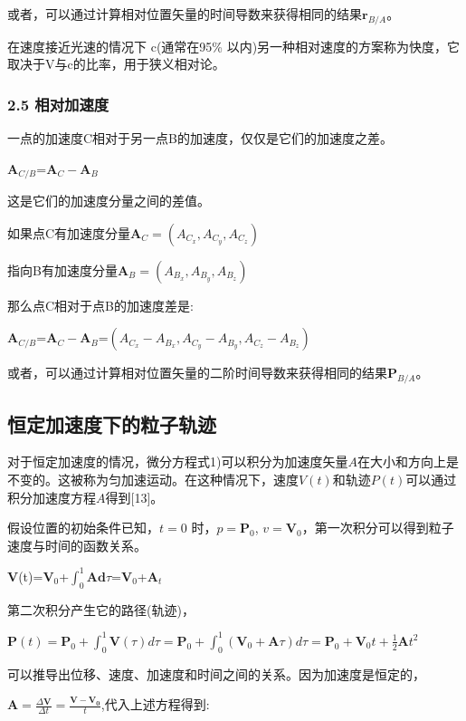或者，可以通过计算相对位置矢量的时间导数来获得相同的结果$\mathbf{r}_{B/A}$。

在速度接近光速的情况下 c(通常在95\% 以内)另一种相对速度的方案称为快度，它取决于V与c的比率，用于狭义相对论。

\subsubsection{2.5 相对加速度}

一点的加速度C相对于另一点B的加速度，仅仅是它们的加速度之差。

$\mathbf{A}_{C/B}$=$\mathbf{A}_{C}-\mathbf{A}_{B}$

这是它们的加速度分量之间的差值。


如果点C有加速度分量$\mathbf{A}_{C}=(A_{C_x},A_{C_y},A_{C_z})$

指向B有加速度分量$\mathbf{A}_{B}=(A_{B_x},A_{B_y},A_{B_z})$

那么点C相对于点B的加速度差是:

$\mathbf{A}_{C/B}$=$\mathbf{A}_{C}-\mathbf{A}_{B}$=$(A_{C_x}-A_{B_x},A_{C_y}-A_{B_y},A_{C_z}-A_{B_z})$

或者，可以通过计算相对位置矢量的二阶时间导数来获得相同的结果$\mathbf{P}_{B/A}$。

\subsection{恒定加速度下的粒子轨迹}

对于恒定加速度的情况，微分方程式1)可以积分为加速度矢量${A}$在大小和方向上是不变的。这被称为匀加速运动。在这种情况下，速度$V(t)$和轨迹$P(t)$可以通过积分加速度方程$A$得到[13]。

假设位置的初始条件已知，$t=0$ 时，$p=\mathbf{P}_0$, $v=\mathbf{V}_0$，第一次积分可以得到粒子速度与时间的函数关系。

$\mathbf{V}$(t)=$\mathbf{V}_{0}$+$\int_{0}^{1}\mathbf{Ad}\tau$=$\mathbf{V}_{0}$+$\mathbf{A}_{t}$

第二次积分产生它的路径(轨迹)，

$\mathbf{P}(t)=\mathbf{P}_{0}+\int_{0}^{1}\mathbf{V}(\tau )d\tau=\mathbf{P}_{0}+\int_{0}^{1}(\mathbf{V}_{0}+\mathbf{A}\tau)d\tau=\mathbf{P}_{0}+\mathbf{V}_{0}t+\frac{1}{2}\mathbf{A}t^2$

可以推导出位移、速度、加速度和时间之间的关系。因为加速度是恒定的，

$\mathbf{A} = \frac{\Delta \mathbf{V}}{\Delta t}=\frac{\mathbf{V}-\mathbf{V_0}}{t}$,代入上述方程得到:

